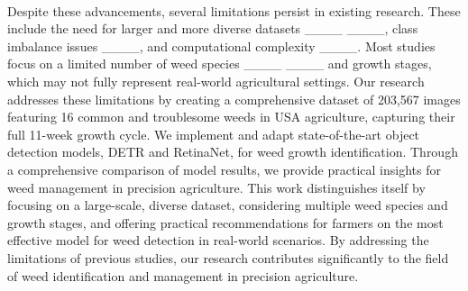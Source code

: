\\
Despite these advancements, several limitations persist in existing research. These include the need for larger and more diverse datasets ____ ____, class imbalance issues ____, and computational complexity ____. Most studies focus on a limited number of weed species ____ ____ and growth stages, which may not fully represent real-world agricultural settings.
Our research addresses these limitations by creating a comprehensive dataset of 203,567 images featuring 16 common and troublesome weeds in USA agriculture, capturing their full 11-week growth cycle. We implement and adapt state-of-the-art object detection models, DETR and RetinaNet, for weed growth identification. Through a comprehensive comparison of model results, we provide practical insights for weed management in precision agriculture.
This work distinguishes itself by focusing on a large-scale, diverse dataset, considering multiple weed species and growth stages, and offering practical recommendations for farmers on the most effective model for weed detection in real-world scenarios. By addressing the limitations of previous studies, our research contributes significantly to the field of weed identification and management in precision agriculture.
